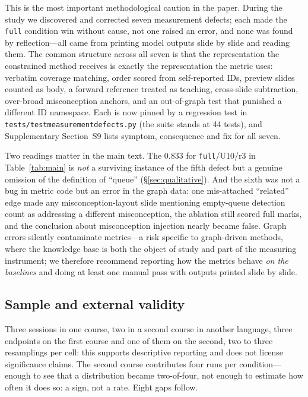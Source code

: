\documentclass[review,12pt]{elsarticle}
\renewcommand{\_}{\kgunderscore\allowbreak}
\newcommand{\id}[1]{\texttt{#1}}
\begin{document}
This is the most important methodological caution in the paper. During the study
we discovered and corrected seven measurement defects; each made the
\id{full} condition win without cause, not one raised an error, and none was
found by reflection---all came from printing model outputs slide by slide and
reading them. The common structure across all seven is that the
representation the constrained method receives is exactly the representation the
metric uses: verbatim coverage matching, order scored from self-reported IDs,
preview slides counted as body, a forward reference treated as teaching,
cross-slide subtraction, over-broad misconception anchors, and an out-of-graph
test that punished a different ID namespace. Each is now pinned by a regression
test in \id{tests/test\_measurement\_defects.py} (the suite stands at 44 tests),
and Supplementary Section~S9 lists symptom, consequence and fix for all seven.

Two readings matter in the main text. The 0.833 for \id{full}/U10/r3 in
Table~\ref{tab:main} is \emph{not} a surviving instance of the fifth defect but a
genuine omission of the definition of ``queue'' (\S\ref{sec:qualitative}). And
the sixth was not a bug in metric code but an error in the graph
data: one mis-attached ``related'' edge made any misconception-layout slide
mentioning empty-queue detection count as addressing a different misconception,
the ablation still scored full marks, and the conclusion about misconception
injection nearly became false. Graph errors silently contaminate
metrics---a risk specific to graph-driven methods, where the knowledge base is
both the object of study and part of the measuring instrument; we therefore
recommend reporting how the metrics behave \emph{on the baselines} and doing at
least one manual pass with outputs printed slide by slide.

\subsection{Sample and external validity}
\label{sec:external}

Three sessions in one course, two in a second course in another language, three
endpoints on the first course and one of them on the second, two to three
resamplings per cell: this supports descriptive reporting and does not license
significance claims. The second course contributes four runs per
condition---enough to see that a distribution became two-of-four, not enough to
estimate how often it does so: a sign, not a rate. Eight gaps follow.
\end{document}
